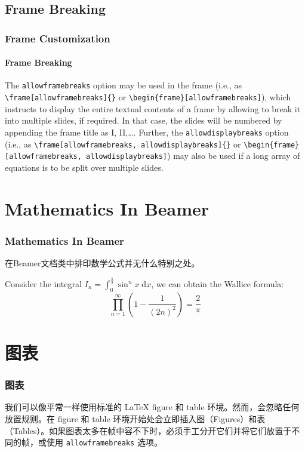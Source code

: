 \documentclass{beamer}
\begin{document}
\subsection{Frame Breaking}
\begin{frame}[containsverbatim]
\frametitle{Frame Customization}
\framesubtitle{Frame Breaking}
The \verb|allowframebreaks| option may be used in the frame (i.e., as \verb|\frame[allowframebreaks]{}| or \verb|\begin{frame}[allowframebreaks]|), which instructs to display the entire textual contents of a frame by allowing to break it into multiple slides, if required. In that case, the slides will be numbered by appending the frame title as I, II,…. Further, the \verb|allowdisplaybreaks| option (i.e., as \verb|\frame[allowframebreaks, allowdisplaybreaks]{}| or \verb|\begin{frame}[allowframebreaks, allowdisplaybreaks]|) may also be used if a long array of equations is to be split over multiple slides.
\end{frame}

\section{Mathematics In Beamer}
\begin{frame}[allowframebreaks]
\frametitle{Mathematics In Beamer}
在Beamer文档类中排印数学公式并无什么特别之处。
\begin{theorem}[Wallice公式]
Consider the integral $\displaystyle I_n=\int_0^{\frac{\pi}{2}}\sin^nx\;\mathrm{d}x$, we can obtain the Wallice formula:
\[\prod_{n=1}^{\infty}\left(1-\frac{1}{(2n)^2}\right)=\frac{2}{\pi}\]
\end{theorem}
\end{frame}

\section{图表}
\begin{frame}[containsverbatim]
\frametitle{图表}
我们可以像平常一样使用标准的 \LaTeX{} figure 和 table 环境。然而，会忽略任何放置规则。在 figure 和 table 环境开始处会立即插入图（Figures）和表（Tables）。如果图表太多在帧中容不下时，必须手工分开它们并将它们放置于不同的帧，或使用 \verb|allowframebreaks| 选项。
\end{frame}
\end{document}
